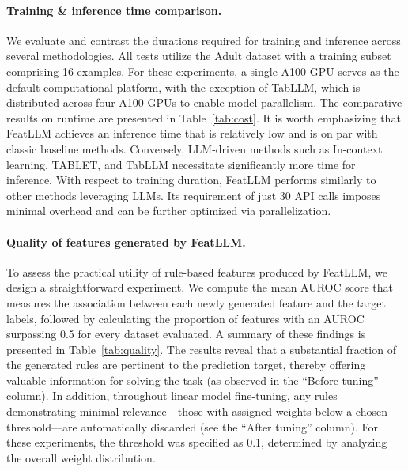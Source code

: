 \vspace*{-0.12in}
\paragraph{Training \& inference time comparison.} We evaluate and contrast the durations required for training and inference across several methodologies. All tests utilize the Adult dataset with a training subset comprising 16 examples. For these experiments, a single A100 GPU serves as the default computational platform, with the exception of TabLLM, which is distributed across four A100 GPUs to enable model parallelism. The comparative results on runtime are presented in Table~\ref{tab:cost}. It is worth emphasizing that \textsf{FeatLLM} achieves an inference time that is relatively low and is on par with classic baseline methods. Conversely, LLM-driven methods such as In-context learning, TABLET, and TabLLM necessitate significantly more time for inference. With respect to training duration, \textsf{FeatLLM} performs similarly to other methods leveraging LLMs. Its requirement of just 30 API calls imposes minimal overhead and can be further optimized via parallelization.

\vspace*{-0.12in}
\paragraph{Quality of features generated by \textsf{FeatLLM}.}
To assess the practical utility of rule-based features produced by \textsf{FeatLLM}, we design a straightforward experiment. We compute the mean AUROC score that measures the association between each newly generated feature and the target labels, followed by calculating the proportion of features with an AUROC surpassing 0.5 for every dataset evaluated. 
A summary of these findings is presented in Table~\ref{tab:quality}. The results reveal that a substantial fraction of the generated rules are pertinent to the prediction target, thereby offering valuable information for solving the task (as observed in the “Before tuning” column). In addition, throughout linear model fine-tuning, any rules demonstrating minimal relevance—those with assigned weights below a chosen threshold—are automatically discarded (see the “After tuning” column). For these experiments, the threshold was specified as 0.1, determined by analyzing the overall weight distribution.

\vspace*{-0.12in}

